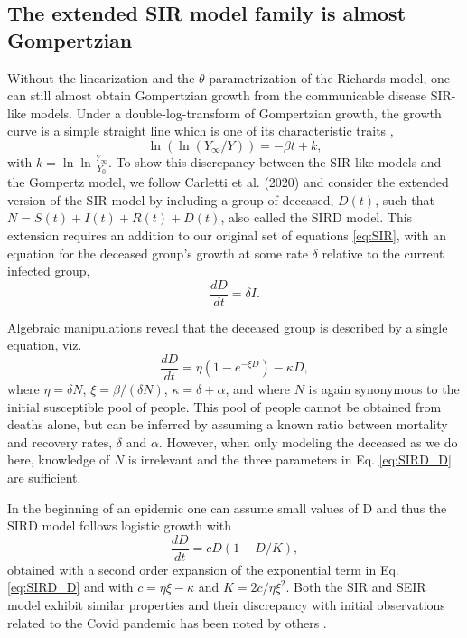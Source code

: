 \documentclass{article}
\begin{document}
\subsection*{The extended SIR model family is almost Gompertzian}
Without the linearization and the $\theta$-parametrization of the Richards model, one can still almost obtain Gompertzian growth from the communicable disease SIR-like models. Under a double-log-transform of Gompertzian growth, the growth curve is a simple straight line which is one of its characteristic traits \cite{Levitt2020},
\begin{equation}
\label{eq:GOMP_D}
\ln{(\ln{(Y_{\infty}/Y)})} = -\beta t + k,
\end{equation}
with $k=\ln{\ln{\frac{Y_{\infty}}{Y_{0}}}}$. To show this discrepancy between the SIR-like models and the Gompertz model, we follow Carletti et al. (2020) \cite{carletti2020covid} and consider the extended version of the SIR model by including a group of deceased, $D(t)$, such that $N = S(t) + I(t) + R(t) + D(t)$, also called the SIRD model. This extension requires an addition to our original set of equations \ref{eq:SIR}, with an equation for the deceased group's growth at some rate $\delta$ relative to the current infected group,
\begin{equation}
\frac{dD}{dt} = \delta I.
\end{equation}

Algebraic manipulations reveal that the deceased group is described by a single equation, viz.
\begin{equation}
\label{eq:SIRD_D}
\frac{dD}{dt} = \eta( 1 - e^{-\xi D}) - \kappa D,
\end{equation}
where $\eta = \delta N$, $\xi = \beta/(\delta N)$, $\kappa = \delta + \alpha$, and where $N$ is again synonymous to the initial susceptible pool of people. This pool of people cannot be obtained from deaths alone, but can be inferred by assuming a known ratio between mortality and recovery rates, $\delta$ and $\alpha$. 
However, when only modeling the deceased as we do here, knowledge of $N$ is irrelevant and the three parameters in Eq. \ref{eq:SIRD_D} are sufficient.

In the beginning of an epidemic one can assume small values of D and thus the SIRD model follows logistic growth with
\begin{equation}
\frac{dD}{dt} = c D (1 - D/K),
\end{equation}
obtained with a second order expansion of the exponential term in Eq. \ref{eq:SIRD_D} and with $c=\eta\xi - \kappa$ and $K=2c/\eta\xi^2$. Both the SIR and SEIR model exhibit similar properties and their discrepancy with initial observations related to the Covid pandemic has been noted by others \cite{vattay2020forecasting}.
\end{document}
